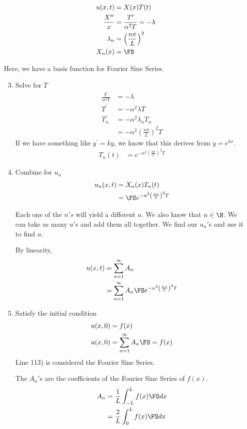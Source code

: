 
\begin{align}
  u(x, t) & = X(x)T(t)\\
  \frac{X^{\prime\prime}}{x} & = \frac{T^\prime}{\alpha^2 T} = - \lambda\\
  \lambda_n & = \left( \frac{n \pi}{L} \right)^2\\
  X_n(x) & = \FS
\end{align}

Here, we have a basis function for Fourier Sine Series.

\begin{enumerate}
  \setcounter{enumi}{2}
  \item Solve for $T$
  \begin{align}
    \frac{T^\prime}{\alpha^2 T} & = - \lambda\\
    T^\prime & = -\alpha^2 \lambda T\\
    T^\prime_n & = - \alpha^2 \lambda_n T_n\\
    & = -\alpha^2 \left( \frac{n \pi}{L} \right)^2 T
  \end{align}
  If we have something like $y^\prime = ky$, we know that this derives from $y = e^{kx}$.
  \begin{align}
    T_n(t) & = e^{-\alpha^2 \left( \frac{n \pi}{L} \right)^2 T}
  \end{align}
  \item Combine for $u_n$
  \begin{align}
    u_n(x, t) & = X_n(x)T_n(t)\\
    & = \FS e^{-\alpha^2 \left( \frac{n \pi}{L} \right)^2 T}
  \end{align}

  Each one of the $n's$ will yield a different $u$. We also know that $n \in \N$. We can take as many $u'$s and add them all together. We find our $u_n'$s and use it to find $u$.

  By linearity,
  \begin{align}
    u(x, t) & = \sum^\infty_{n = 1} A_n\\
    & = \sum^\infty_{n = 1} A_n \FS e^{-\alpha^2 \left( \frac{n \pi}{L} \right)^2 T}
  \end{align}

  \item Satisfy the initial condition
  \begin{align}
    u(x, 0) & = f(x)\\
    u(x, 0) & = \sum^\infty_{n = 1} A_n \FS = f(x)
  \end{align}
  Line 113) is considered the Fourier Sine Series.

  The $A_n'$s are the coefficients of the Fourier Sine Series of $f(x)$.
  \begin{align}
    A_n & = \frac{1}{L} \int^L_{-L} f(x) \FS dx\\
    & = \frac{2}{L} \int^L_0 f(x) \FS dx
  \end{align}
\end{enumerate}

